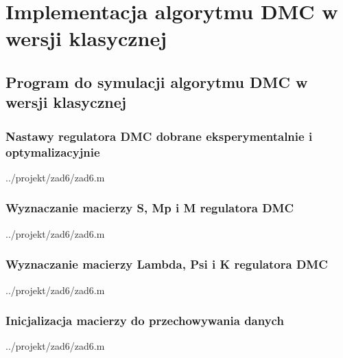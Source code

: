 \section{Implementacja algorytmu DMC w wersji klasycznej}
\label{projekt:zad6}


\subsection{Program do symulacji algorytmu DMC w wersji klasycznej}

\subsubsection{Nastawy regulatora DMC dobrane eksperymentalnie i optymalizacyjnie}

\ifdefined\CompileListings
    
        {../projekt/zad6/zad6.m}
    \newpage
\fi

\subsubsection{Wyznaczanie macierzy S, Mp i M regulatora DMC}

\ifdefined\CompileListings
    
        {../projekt/zad6/zad6.m}
    \newpage
\fi

\subsubsection{Wyznaczanie macierzy Lambda, Psi i K regulatora DMC}

\ifdefined\CompileListings
    
        {../projekt/zad6/zad6.m}
    \newpage
\fi

\subsubsection{Inicjalizacja macierzy do przechowywania danych}

\ifdefined\CompileListings
    
        {../projekt/zad6/zad6.m}
\fi

